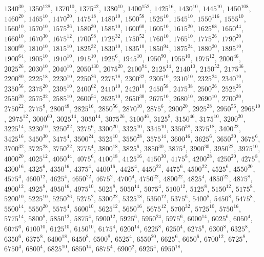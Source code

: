 \begin{itemize}
$1340^{30}$, $1350^{128}$, $1370^{10}$, $1375^{42}$, $1380^{10}$, $1400^{152}$, $1425^{16}$, $1430^{10}$, $1445^{10}$, $1450^{108}$, $1460^{20}$, $1465^{10}$, $1470^{20}$, $1475^{18}$, $1480^{10}$, $1500^{58}$, $1525^{10}$, $1545^{10}$, $1550^{116}$, $1555^{10}$, $1560^{10}$, $1570^{10}$, $1575^{36}$, $1580^{30}$, $1585^{10}$, $1600^{60}$, $1605^{10}$, $1615^{20}$, $1625^{68}$, $1650^{44}$, $1660^{10}$, $1670^{30}$, $1675^{12}$, $1700^{98}$, $1725^{32}$, $1750^{52}$, $1760^{10}$, $1765^{10}$, $1775^{26}$, $1790^{20}$, $1800^{60}$, $1810^{10}$, $1815^{10}$, $1825^{32}$, $1830^{10}$, $1835^{10}$, $1850^{94}$, $1875^{24}$, $1880^{20}$, $1895^{10}$, $1900^{64}$, $1905^{10}$, $1910^{10}$, $1915^{10}$, $1925^{6}$, $1945^{10}$, $1950^{90}$, $1955^{10}$, $1975^{12}$, $2000^{46}$, $2025^{26}$, $2030^{10}$, $2040^{10}$, $2050^{130}$, $2075^{20}$, $2100^{94}$, $2125^{14}$, $2140^{10}$, $2150^{52}$, $2175^{36}$, $2200^{80}$, $2225^{18}$, $2230^{10}$, $2250^{26}$, $2275^{18}$, $2300^{32}$, $2305^{10}$, $2310^{10}$, $2325^{24}$, $2340^{10}$, $2350^{56}$, $2375^{20}$, $2395^{10}$, $2400^{62}$, $2410^{10}$, $2420^{10}$, $2450^{58}$, $2475^{38}$, $2500^{26}$, $2525^{26}$, $2550^{20}$, $2575^{32}$, $2585^{10}$, $2600^{54}$, $2625^{10}$, $2650^{30}$, $2675^{10}$, $2680^{10}$, $2690^{10}$, $2700^{30}$, $2750^{22}$, $2775^{8}$, $2800^{48}$, $2825^{16}$, $2850^{56}$, $2870^{10}$, $2875^{6}$, $2900^{20}$, $2925^{28}$, $2950^{56}$, $2965^{10}$, $2975^{12}$, $3000^{60}$, $3025^{14}$, $3050^{14}$, $3075^{26}$, $3100^{46}$, $3125^{8}$, $3150^{46}$, $3175^{10}$, $3200^{20}$, $3225^{14}$, $3230^{10}$, $3250^{32}$, $3275^{6}$, $3300^{20}$, $3325^{10}$, $3345^{10}$, $3350^{38}$, $3375^{18}$, $3400^{22}$, $3425^{16}$, $3450^{30}$, $3475^{4}$, $3500^{24}$, $3525^{10}$, $3550^{28}$, $3575^{14}$, $3600^{16}$, $3625^{6}$, $3650^{30}$, $3675^{6}$, $3700^{32}$, $3725^{28}$, $3750^{22}$, $3775^{4}$, $3800^{18}$, $3825^{6}$, $3850^{30}$, $3875^{4}$, $3900^{30}$, $3950^{22}$, $3975^{10}$, $4000^{20}$, $4025^{12}$, $4050^{44}$, $4075^{6}$, $4100^{18}$, $4125^{16}$, $4150^{30}$, $4175^{8}$, $4200^{28}$, $4250^{20}$, $4275^{8}$, $4300^{16}$, $4325^{6}$, $4350^{16}$, $4375^{4}$, $4400^{16}$, $4425^{4}$, $4450^{22}$, $4475^{6}$, $4500^{22}$, $4525^{6}$, $4550^{20}$, $4575^{4}$, $4600^{12}$, $4625^{4}$, $4650^{22}$, $4675^{2}$, $4700^{4}$, $4750^{22}$, $4800^{22}$, $4825^{4}$, $4850^{22}$, $4875^{8}$, $4900^{12}$, $4925^{8}$, $4950^{16}$, $4975^{10}$, $5025^{8}$, $5050^{14}$, $5075^{4}$, $5100^{12}$, $5125^{8}$, $5150^{12}$, $5175^{8}$, $5200^{10}$, $5225^{10}$, $5250^{26}$, $5275^{2}$, $5300^{22}$, $5325^{18}$, $5350^{12}$, $5375^{6}$, $5400^{8}$, $5450^{8}$, $5475^{8}$, $5500^{14}$, $5550^{20}$, $5575^{4}$, $5600^{10}$, $5625^{12}$, $5650^{16}$, $5675^{12}$, $5700^{32}$, $5725^{10}$, $5750^{16}$, $5775^{14}$, $5800^{8}$, $5850^{12}$, $5875^{4}$, $5900^{12}$, $5925^{6}$, $5950^{24}$, $5975^{6}$, $6000^{14}$, $6025^{6}$, $6050^{4}$, $6075^{6}$, $6100^{10}$, $6125^{10}$, $6150^{10}$, $6175^{4}$, $6200^{14}$, $6225^{8}$, $6250^{4}$, $6275^{6}$, $6300^{8}$, $6325^{8}$, $6350^{6}$, $6375^{8}$, $6400^{18}$, $6450^{8}$, $6500^{8}$, $6525^{4}$, $6550^{20}$, $6625^{6}$, $6650^{6}$, $6700^{12}$, $6725^{8}$, $6750^{4}$, $6800^{4}$, $6825^{10}$, $6850^{14}$, $6875^{4}$, $6900^{2}$, $6925^{4}$, $6950^{18}$, 
\end{itemize}
